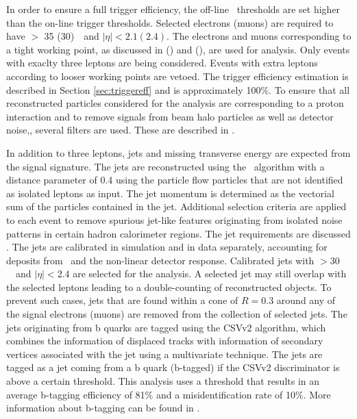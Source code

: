 In order to ensure a full trigger efficiency, the off-line \pt\ thresholds are set higher than the on-line trigger thresholds. 
Selected electrons (muons) are required to have \pt $>$ 35 (30)~\GeV\ and $|\eta| < 2.1 (2.4)$. The electrons and muons corresponding to a tight working point, as discussed in  () and  (), are used for analysis. Only events with exaclty three leptons are being considered. Events with extra leptons according to looser working points are vetoed. The trigger efficiency estimation is described in Section \ref{sec:triggereff} and is approximately 100\%. To ensure that all reconstructed particles considered for the analysis are corresponding to a proton interaction and to remove signals from beam halo particles as well as detector noise,, several filters are used. These are described in .

In addition to three leptons, jets and missing transverse energy are expected from the signal signature. The jets are reconstructed using the \antikt\ algorithm with a distance parameter of 0.4 using the particle flow particles that are not identified as isolated leptons as input. The jet momentum is determined as the vectorial sum of the particles contained in the jet. Additional selection criteria are applied to each event to remove spurious jet-like features originating from isolated noise patterns in certain hadron calorimeter regions. The jet requirements are discussed . The jets are calibrated in simulation and in data separately, accounting for deposits from \pu\ and the non-linear detector response. Calibrated jets with \pt $> 30$~\GeV\ and $|\eta| < 2.4$ are selected for the analysis.  A selected jet may still overlap with the selected leptons leading to a double-counting of reconstructed objects. To prevent such cases, jets that are found within a cone of  $R = 0.3$ around any of the signal electrons (muons) are removed from the collection of selected jets. The jets originating from b quarks are tagged using the CSVv2 algorithm, which combines the information of displaced tracks with information of secondary vertices associated with the jet using a multivariate technique. The jets are tagged as a jet coming from a b quark (b-tagged) if the CSVv2 discriminator is above a certain threshold.  This analysis uses a threshold that results in an average b-tagging efficiency of 81\% and a misidentification rate of 10\%. More information about b-tagging can be found in .

